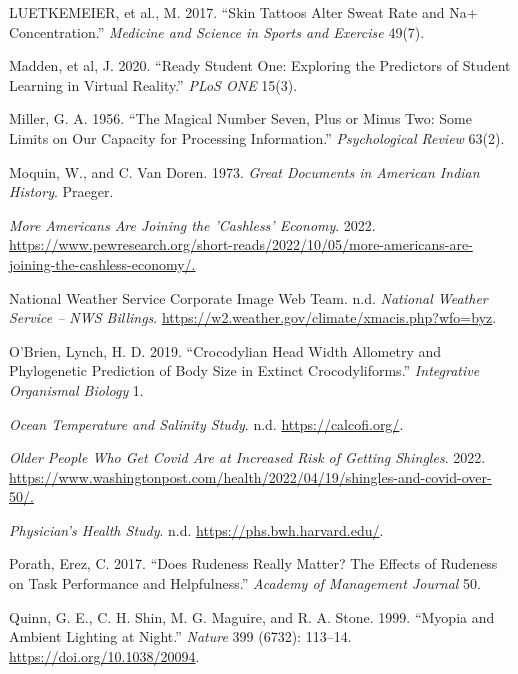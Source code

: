 \documentclass[
]{report}
\newlength{\cslhangindent}
\newenvironment{CSLReferences}[2] %
 {\begin{list}{}{%
  \setlength{\itemindent}{0pt}
  \setlength{\leftmargin}{0pt}
  \setlength{\parsep}{0pt}
  \ifodd #1
   \setlength{\leftmargin}{\cslhangindent}
   \setlength{\itemindent}{-1\cslhangindent}
  \fi
  \setlength{\itemsep}{#2\baselineskip}}}
 {\end{list}}
\begin{document}
\begin{CSLReferences}{1}{1}
{LUETKEMEIER, et al., M.} 2017. {``Skin Tattoos Alter Sweat Rate and Na+ Concentration.''} \emph{Medicine and Science in Sports and Exercise} 49(7).

{Madden, et al, J.} 2020. {``Ready Student One: Exploring the Predictors of Student Learning in Virtual Reality.''} \emph{PLoS ONE} 15(3).

Miller, G. A. 1956. {``The Magical Number Seven, Plus or Minus Two: Some Limits on Our Capacity for Processing Information.''} \emph{Psychological Review} 63(2).

Moquin, W., and C. Van Doren. 1973. \emph{Great Documents in American Indian History}. Praeger.

\emph{More Americans Are Joining the 'Cashless' Economy}. 2022. \url{https://www.pewresearch.org/short-reads/2022/10/05/more-americans-are-joining-the-cashless-economy/.}

National Weather Service Corporate Image Web Team. n.d. \emph{National Weather Service -- {NWS} Billings}. \url{https://w2.weather.gov/climate/xmacis.php?wfo=byz}.

O'Brien, Lynch, H. D. 2019. {``Crocodylian Head Width Allometry and Phylogenetic Prediction of Body Size in Extinct Crocodyliforms.''} \emph{Integrative Organismal Biology} 1.

\emph{Ocean Temperature and Salinity Study}. n.d. \url{https://calcofi.org/}.

\emph{Older People Who Get Covid Are at Increased Risk of Getting Shingles}. 2022. \url{https://www.washingtonpost.com/health/2022/04/19/shingles-and-covid-over-50/.}

\emph{Physician's Health Study}. n.d. \url{https://phs.bwh.harvard.edu/}.

Porath, Erez, C. 2017. {``Does Rudeness Really Matter? The Effects of Rudeness on Task Performance and Helpfulness.''} \emph{Academy of Management Journal} 50.

Quinn, G. E., C. H. Shin, M. G. Maguire, and R. A. Stone. 1999. {``Myopia and Ambient Lighting at Night.''} \emph{Nature} 399 (6732): 113--14. \url{https://doi.org/10.1038/20094}.


\end{CSLReferences}
\end{document}
